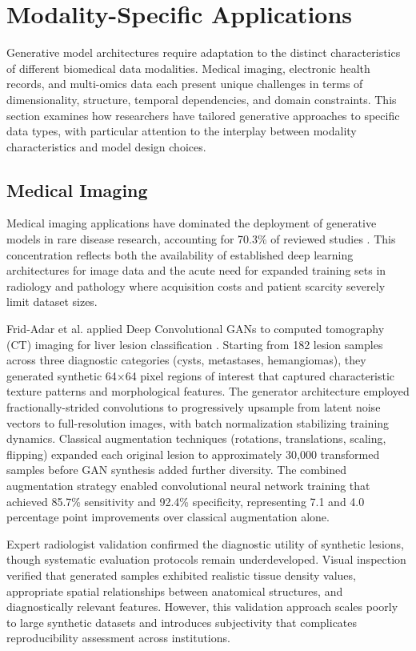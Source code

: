 \section{Modality-Specific Applications}
\label{sec:applications}

Generative model architectures require adaptation to the distinct characteristics of different biomedical data modalities. Medical imaging, electronic health records, and multi-omics data each present unique challenges in terms of dimensionality, structure, temporal dependencies, and domain constraints. This section examines how researchers have tailored generative approaches to specific data types, with particular attention to the interplay between modality characteristics and model design choices.

\subsection{Medical Imaging}

Medical imaging applications have dominated the deployment of generative models in rare disease research, accounting for 70.3\% of reviewed studies \cite{finetti2025data}. This concentration reflects both the availability of established deep learning architectures for image data and the acute need for expanded training sets in radiology and pathology where acquisition costs and patient scarcity severely limit dataset sizes.

Frid-Adar et al. applied Deep Convolutional GANs to computed tomography (CT) imaging for liver lesion classification \cite{fridadar2018gan}. Starting from 182 lesion samples across three diagnostic categories (cysts, metastases, hemangiomas), they generated synthetic 64×64 pixel regions of interest that captured characteristic texture patterns and morphological features. The generator architecture employed fractionally-strided convolutions to progressively upsample from latent noise vectors to full-resolution images, with batch normalization stabilizing training dynamics. Classical augmentation techniques (rotations, translations, scaling, flipping) expanded each original lesion to approximately 30,000 transformed samples before GAN synthesis added further diversity. The combined augmentation strategy enabled convolutional neural network training that achieved 85.7\% sensitivity and 92.4\% specificity, representing 7.1 and 4.0 percentage point improvements over classical augmentation alone.

Expert radiologist validation confirmed the diagnostic utility of synthetic lesions, though systematic evaluation protocols remain underdeveloped. Visual inspection verified that generated samples exhibited realistic tissue density values, appropriate spatial relationships between anatomical structures, and diagnostically relevant features. However, this validation approach scales poorly to large synthetic datasets and introduces subjectivity that complicates reproducibility assessment across institutions.

